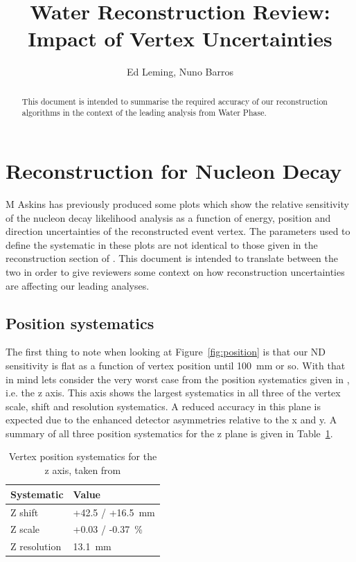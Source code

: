 \documentclass[]{article}
\title{Water Reconstruction Review: Impact of Vertex Uncertainties}
\author{Ed Leming, Nuno Barros}
\begin{document}
\maketitle

\begin{abstract}
This document is intended to summarise the required accuracy of our reconstruction algorithms in the context of the leading analysis from Water Phase.
\end{abstract}

\section{Reconstruction for Nucleon Decay}
M Askins \cite{MorganTalk} has previously produced some plots which show the relative sensitivity of the nucleon decay likelihood analysis as a function of energy, position and direction uncertainties of the reconstructed event vertex. The parameters used to define the systematic in these plots are not identical to those given in the reconstruction section of \cite{WaterUniDoc}. This document is intended to translate between the two in order to give reviewers some context on how reconstruction uncertainties are affecting our leading analyses.

\subsection{Position systematics}
The first thing to note when looking at Figure~\ref{fig:position} is that our ND sensitivity is flat as a function of vertex position until 100~mm or so. With that in mind lets consider the very worst case from the position systematics given in \cite{WaterUniDoc}, i.e. the z axis. This axis shows the largest systematics in all three of the vertex scale, shift and resolution systematics. A reduced accuracy in this plane is expected due to the enhanced detector asymmetries relative to the x and y. A summary of all three position systematics for the z plane is given in Table~\ref{tab:position}. 

\begin{table}
	\label{tab:position}
	\centering
\begin{tabular}{p{2.5cm}|p{3.5cm}}
	\hline
	Systematic &  Value\\
	\hline
	\hline
	Z shift & +42.5 / +16.5~mm \\
	Z scale & +0.03 / -0.37~\%\\
	Z resolution & 13.1~mm\\
	\hline
\end{tabular}
\caption{Vertex position systematics for the z axis, taken from \cite{WaterUniDoc}}
\end{table}
\end{document}
